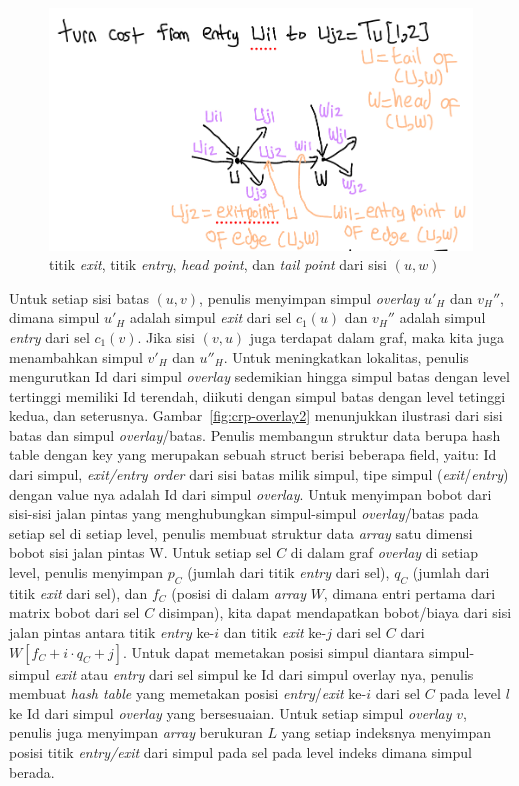 \begin{figure}[H]
    \includegraphics[scale=0.4]{figures/turn_cost_exit_entry.png}
    \caption{titik \textit{exit}, titik \textit{entry}, \textit{head point}, dan \textit{tail point} dari sisi $(u,w)$}
    \label{fig:crp-exit-entry-point}
\end{figure}


Untuk setiap sisi batas $(u,v)$, penulis menyimpan simpul \textit{overlay} $u'_{H}$ dan $v_{H}''$, dimana simpul $u'_{H}$  adalah simpul \textit{exit} dari sel $c_1(u)$ dan $v_{H}''$ adalah simpul \textit{entry} dari sel $c_1(v)$. Jika sisi $(v,u)$ juga terdapat dalam graf, maka kita juga menambahkan simpul $v'_H$ dan $u''_{H}$. Untuk meningkatkan lokalitas, penulis mengurutkan Id dari simpul \textit{overlay} sedemikian hingga simpul batas dengan level tertinggi memiliki Id terendah, diikuti dengan simpul batas dengan level tetinggi kedua, dan seterusnya. Gambar~\ref{fig:crp-overlay2} menunjukkan ilustrasi dari sisi batas dan simpul \textit{overlay}/batas. Penulis membangun struktur data berupa hash table dengan key yang merupakan sebuah struct berisi beberapa field, yaitu: Id dari simpul, \textit{exit/entry order} dari sisi batas milik simpul, tipe simpul (\textit{exit}/\textit{entry}) dengan value nya adalah Id dari simpul \textit{overlay}. Untuk menyimpan bobot dari sisi-sisi jalan pintas yang menghubungkan simpul-simpul \textit{overlay}/batas pada setiap sel di setiap level, penulis membuat struktur data \textit{array} satu dimensi bobot sisi jalan pintas W. Untuk setiap sel $C$  di dalam graf \textit{overlay} di setiap level, penulis menyimpan $p_C$ (jumlah dari titik \textit{entry} dari sel), $q_C$ (jumlah dari titik \textit{exit} dari sel), dan $f_C$ (posisi di dalam \textit{array} $W$, dimana entri pertama dari matrix bobot dari sel $C$ disimpan), kita dapat mendapatkan bobot/biaya dari sisi jalan pintas antara titik \textit{entry} ke-$i$ dan titik \textit{exit} ke-$j$ dari sel $C$ dari $W[f_C+i\cdot q_C + j]$. Untuk dapat memetakan posisi simpul diantara simpul-simpul \textit{exit} atau \textit{entry} dari sel simpul ke Id dari simpul overlay nya, penulis membuat \textit{hash table} yang memetakan posisi \textit{entry}/\textit{exit} ke-$i$ dari sel $C$ pada level $l$ ke Id dari simpul \textit{overlay} yang bersesuaian. Untuk setiap simpul \textit{overlay} $v$, penulis juga menyimpan \textit{array} berukuran $L$ yang setiap indeksnya menyimpan posisi titik \textit{entry/exit} dari simpul pada sel pada level indeks dimana simpul berada.



